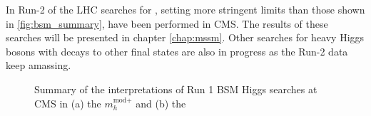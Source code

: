 In Run-2 of the \ac{LHC} searches for \AHtotautau, setting more stringent limits than those shown in \ref{fig:bsm_summary},
have been performed in \ac{CMS}. The results of these searches will be presented in chapter \ref{chap:mssm}. Other searches
for heavy Higgs bosons with decays to other final states are also in progress as the Run-2 data keep
amassing. 

\begin{figure}[h!]
\begin{center}
\end{center}
\caption{Summary of the interpretations of Run 1 BSM Higgs searches at \ac{CMS} in (a) the $m_{h}^{\text{mod+}}$ and (b) the
}
\end{figure}
